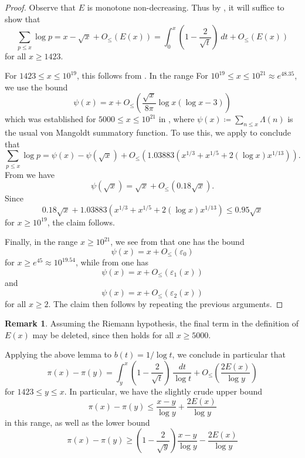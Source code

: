 \documentclass[12pt,a4paper,reqno]{amsart}
\numberwithin{equation}{section}
\theoremstyle{plain}
\theoremstyle{definition}
\newtheorem{remark}[theorem]{Remark}
\newcommand\eps{\varepsilon}
\begin{document}
\begin{proof} Observe that $E$ is monotone non-decreasing. Thus by , it will suffice to show that
$$ \sum_{p \leq x} \log p = x - \sqrt{x} + O_{\leq}(E(x))
  = \int_0^x \left(1-\frac{2}{\sqrt{t}}\right)\ dt + O_{\leq}(E(x))$$
for all $x \geq 1423$.

For $1423 \leq x \leq 10^{19}$, this follows from \cite[Theorem 2]{buthe-2}.  In the range
For $10^{19} \leq x \leq 10^{21} \approx e^{48.35}$, we use the bound
  $$ \psi(x) = x + O_{\leq}\left(\frac{\sqrt{x}}{8\pi} \log x(\log x - 3)\right)
$$
which was established for $5000 \leq x \leq 10^{21}$ in \cite[(7.3)]{buthe}, where $\psi(x) \coloneqq \sum_{n \leq x} \Lambda(n)$ is the usual von Mangoldt summatory function.  To use this, we apply \cite[(6.10), (6.11)]{buthe} to conclude that
$$
\sum_{p \leq x} \log p = \psi(x) - \psi(\sqrt{x}) + O_{\leq}(1.03883 (x^{1/3} + x^{1/5} + 2 (\log x) x^{1/13})).$$
From \cite[Theorems 10,12]{rs} we have
$$ \psi(\sqrt{x}) = \sqrt{x} + O_{\leq}(0.18 \sqrt{x}).$$
Since
$$ 0.18 \sqrt{x} + 1.03883 (x^{1/3} + x^{1/5} + 2 (\log x) x^{1/13}) \leq 0.95 \sqrt{x}$$
for $x \geq 10^{19}$, the claim follows.

Finally, in the range $x \geq 10^{21}$, we see from \cite[Theorem 1, Table 1]{buthe} that one has the bound
$$ \psi(x) = x + O_{\leq}(\eps_0)$$
for $x \geq e^{45} \approx 10^{19.54}$, while from \cite[Theorems 1.1, 1.4]{johnston-yang} one has
$$ \psi(x) = x + O_{\leq}(\eps_1(x))$$
and
$$ \psi(x) = x + O_{\leq}(\eps_2(x))$$
for all $x \geq 2$.  The claim then follows by repeating the previous arguments.
\end{proof}
    
\begin{remark} Assuming the Riemann hypothesis, the final term in the definition of $E(x)$ may be deleted, since \cite[(7.3)]{buthe} then holds for all $x \geq 5000$.  
\end{remark}

Applying the above lemma to $b(t) = 1/\log t$, we conclude in particular that
\begin{equation}\label{pi-est} \pi(x) - \pi(y) = \int_y^x \left(1 - \frac{2}{\sqrt{t}}\right) \ \frac{dt}{\log t}
+ O_\leq\left(\frac{2 E(x)}{\log y}\right)
\end{equation}
for $1423 \leq y \leq x$. In particular, we have the slightly crude upper bound
\begin{equation}\label{pixy-upper} \pi(x) - \pi(y) \leq \frac{x-y}{\log y} + \frac{2 E(x)}{\log y}
\end{equation}
in this range, as well as the lower bound
\begin{equation}\label{pixy-lower} \pi(x) - \pi(y) \geq \left(1-\frac{2}{\sqrt{y}}\right)\frac{x-y}{\log y} - \frac{2 E(x)}{\log y}
\end{equation}
\end{document}

